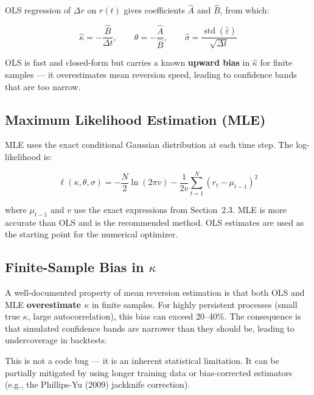 \documentclass[11pt, letterpaper]{article}
\begin{document}
OLS regression of $\Delta r$ on $r(t)$ gives coefficients $\hat{A}$ and
$\hat{B}$, from which:

\begin{equation}
  \hat{\kappa} = -\frac{\hat{B}}{\Delta t},
  \qquad
  \hat{\theta} = -\frac{\hat{A}}{\hat{B}},
  \qquad
  \hat{\sigma} = \frac{\operatorname{std}(\hat{\varepsilon})}{\sqrt{\Delta t}}
\end{equation}

OLS is fast and closed-form but carries a known \textbf{upward bias} in
$\hat{\kappa}$ for finite samples --- it overestimates mean reversion speed,
leading to confidence bands that are too narrow.

\subsection{Maximum Likelihood Estimation (MLE)}

MLE uses the exact conditional Gaussian distribution at each time step. The
log-likelihood is:

\begin{equation}
  \ell(\kappa, \theta, \sigma) =
    -\frac{N}{2}\ln(2\pi v)
    - \frac{1}{2v}\sum_{t=1}^{N}\!\left(r_t - \mu_{t-1}\right)^2
\end{equation}

where $\mu_{t-1}$ and $v$ use the exact expressions from Section~2.3. MLE is
more accurate than OLS and is the recommended method. OLS estimates are used
as the starting point for the numerical optimizer.

\subsection{Finite-Sample Bias in $\kappa$}

A well-documented property of mean reversion estimation is that both OLS and
MLE \textbf{overestimate $\kappa$} in finite samples. For highly persistent
processes (small true $\kappa$, large autocorrelation), this bias can exceed
20--40\%. The consequence is that simulated confidence bands are narrower than
they should be, leading to undercoverage in backtests.

This is not a code bug --- it is an inherent statistical limitation. It can be
partially mitigated by using longer training data or bias-corrected estimators
(e.g., the Phillips-Yu (2009) jackknife correction).

\end{document}
